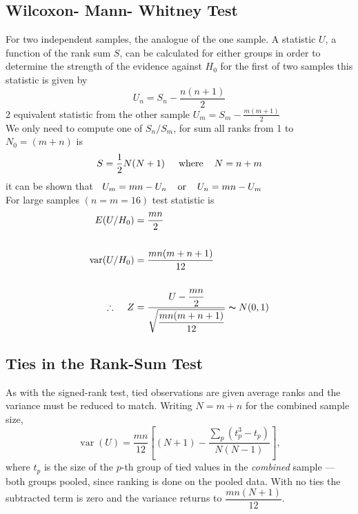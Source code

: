 \documentclass[11pt,a4paper]{article}
\theoremstyle{definition}
\begin{document}
\subsection{Wilcoxon- Mann- Whitney Test}
For two independent samples, the analogue of the one sample. A statistic $U$, a function of the rank sum $S$, can be calculated for either groups in order to determine the strength  of the evidence against $H_0$ for the first of two samples this statistic is given by $$U_n=S_n-\frac{n(n+1)}{2}$$ 2 equivalent statistic from the other sample \hspace{0.2cm}$\displaystyle{U_m=S_m-\frac{m(m+1)}{2}}$\\
We only need to compute one of $S_n/S_m$, for sum all ranks from 1 to\hspace{0.2cm} $N_0=(m+n)$ is $$S=\frac{1}{2}N(N+1)\hspace{0.5cm} \text{where}\hspace{0.4cm} N=n+m$$ it can be shown that $\hspace{0.2cm} U_m =mn-U_n\hspace{0.4cm} \text{or}\hspace{0.4cm} U_n =mn-U_m$\\

For large samples $(n=m=16)$ test statistic is 
\begin{align*}
E(U/H_0) &=\frac{mn}{2}\\\\
\text{var}(U/H_0) &=\frac{mn(m+n+1)}{12}\\\\
\therefore \hspace{0.4cm} Z &=\frac{U-\dfrac{mn}{2}}{\sqrt{\dfrac{mn(m+n+1)}{12}}}\thicksim N(0,1)
\end{align*}

\subsection{Ties in the Rank-Sum Test}
As with the signed-rank test, tied observations are given average ranks and the
variance must be reduced to match. Writing $N = m + n$ for the combined sample
size,
$$\operatorname{var}(U) = \dfrac{mn}{12}\left[
(N + 1) - \dfrac{\sum_{p}\left(t_p^{3} - t_p\right)}{N(N-1)}\right],$$
where $t_p$ is the size of the $p$-th group of tied values in the \emph{combined}
sample --- both groups pooled, since ranking is done on the pooled data. With no
ties the subtracted term is zero and the variance returns to
$\dfrac{mn(N+1)}{12}$.
\end{document}
